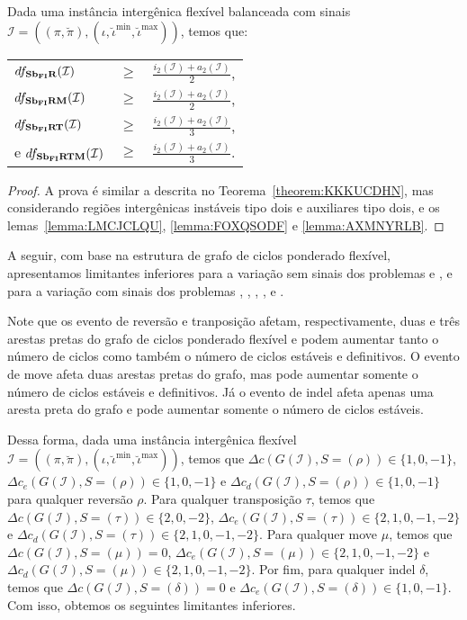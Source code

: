 \begin{theorem}\label{theorem:ZJKGKRKE}
Dada uma instância intergênica flexível balanceada com sinais $\mathcal{I} = ((\pi,\breve\pi),(\iota,\breve\iota^{\min},\breve\iota^{\max}))$, temos que:

\begin{tabular}{lll}
  $df_{\textbf{Sb\textsubscript{FI}R}}(\mathcal{I})$      & $ \ge $ & $\frac{i_2(\mathcal{I}) + a_2(\mathcal{I})}{2}$, \\ 
  $df_{\textbf{Sb\textsubscript{FI}RM}}(\mathcal{I})$     & $ \ge $ & $\frac{i_2(\mathcal{I}) + a_2(\mathcal{I})}{2}$, \\
  $df_{\textbf{Sb\textsubscript{FI}RT}}(\mathcal{I})$     & $ \ge $ & $\frac{i_2(\mathcal{I}) + a_2(\mathcal{I})}{3}$, \\
  e $df_{\textbf{Sb\textsubscript{FI}RTM}}(\mathcal{I})$  & $ \ge $ & $\frac{i_2(\mathcal{I}) + a_2(\mathcal{I})}{3}$. \\
\end{tabular}
\end{theorem}
\begin{proof}
A prova é similar a descrita no Teorema~\ref{theorem:KKKUCDHN}, mas considerando regiões intergênicas instáveis tipo dois e auxiliares tipo dois, e os lemas~\ref{lemma:LMCJCLQU}, \ref{lemma:FOXQSODF} e \ref{lemma:AXMNYRLB}.
\end{proof}

A seguir, com base na estrutura de grafo de ciclos ponderado flexível, apresentamos limitantes inferiores para a variação sem sinais dos problemas \SbFIT{} e \SbFITM{}, e para a variação com sinais dos problemas \SbFIR{}, \SbFIRI{}, \SbFIRM{}, \SbFIRMI{}, \SbFIRT{} e \SbFIRTM{}.

Note que os evento de reversão e tranposição afetam, respectivamente, duas e três arestas pretas do grafo de ciclos ponderado flexível e podem aumentar tanto o número de ciclos como também o número de ciclos estáveis e definitivos. O evento de move afeta duas arestas pretas do grafo, mas pode aumentar somente o número de ciclos estáveis e definitivos. Já o evento de indel afeta apenas uma aresta preta do grafo e pode aumentar somente o número de ciclos estáveis.

Dessa forma, dada uma instância intergênica flexível $\mathcal{I} = ((\pi,\breve\pi),(\iota,\breve\iota^{\min},\breve\iota^{\max}))$, temos que $\Delta c(G(\mathcal{I}), S=(\rho)) \in \{1,0,-1\}$, $\Delta c_e(G(\mathcal{I}), S=(\rho)) \in \{1,0,-1\}$ e $\Delta c_d(G(\mathcal{I}), S=(\rho)) \in \{1,0,-1\}$ para qualquer reversão $\rho$. Para qualquer transposição $\tau$, temos que $\Delta c(G(\mathcal{I}), S=(\tau)) \in \{2,0,-2\}$, $\Delta c_e(G(\mathcal{I}), S=(\tau)) \in \{2,1,0,-1,-2\}$ e $\Delta c_d(G(\mathcal{I}), S=(\tau)) \in \{2,1,0,-1,-2\}$. Para qualquer move $\mu$, temos que $\Delta c(G(\mathcal{I}), S=(\mu)) = 0$, $\Delta c_e(G(\mathcal{I}), S=(\mu)) \in \{2,1,0,-1,-2\}$ e $\Delta c_d(G(\mathcal{I}), S=(\mu)) \in \{2,1,0,-1,-2\}$. Por fim, para qualquer indel $\delta$, temos que $\Delta c(G(\mathcal{I}), S=(\delta)) = 0$ e $\Delta c_e(G(\mathcal{I}), S=(\delta)) \in \{1,0,{-1}\}$. Com isso, obtemos os seguintes limitantes inferiores.

